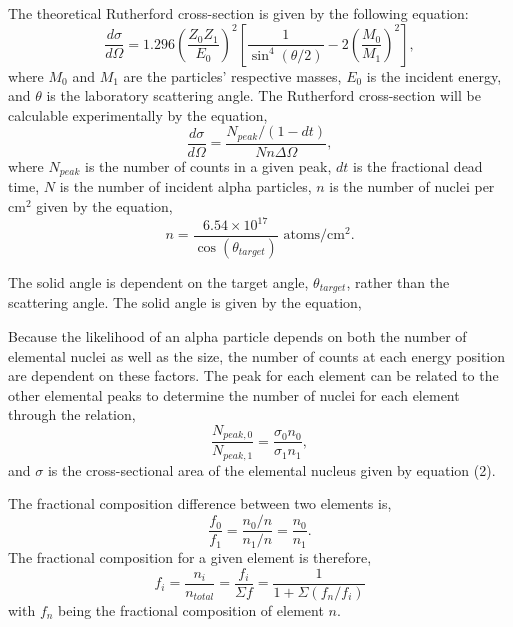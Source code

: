 \documentclass[10pt]{IEEEtran}
\begin{document}
The theoretical Rutherford cross-section is given by the following equation:
\begin{equation}
\frac{d\sigma}{d\Omega} = 1.296\left(\frac{Z_0 Z_1}{E_0}\right)^2\left[\frac{1}{\sin^4(\theta/2)}-2\left(\frac{M_0}{M_1}\right)^2\right],
\end{equation}
where $M_0$ and $M_1$ are the particles' respective masses, $E_0$ is the incident energy, and $\theta$ is the laboratory scattering angle. The Rutherford cross-section will be calculable experimentally by the equation\cite{blackboard},
\begin{equation}
\frac{d\sigma}{d\Omega} = \frac{N_{peak}/(1-dt)}{Nn\Delta\Omega},
\end{equation}
where $N_{peak}$ is the number of counts in a given peak, $dt$ is the fractional dead time, $N$ is the number of incident alpha particles, $n$ is the number of nuclei per cm$^2$ given by the equation,
\begin{equation}
n = \frac{6.54\times10^{17}}{\cos(\theta_{target})}\text{ atoms/cm$^2$}.
\end{equation}

The solid angle is dependent on the target angle, $\theta_{target}$, rather than the scattering angle. The solid angle is given by the equation,

Because the likelihood of an alpha particle depends on both the number of elemental nuclei as well as the size, the number of counts at each energy position are dependent on these factors. The peak for each element can be related to the other elemental peaks to determine the number of nuclei for each element through the relation,
\begin{equation}
\frac{N_{peak,0}}{N_{peak,1}} = \frac{\sigma_{0}n_{0}}{\sigma_{1}n_{1}},
\end{equation}
and $\sigma$ is the cross-sectional area of the elemental nucleus given by equation (2).

The fractional composition difference between two elements is,
\begin{equation}
\frac{f_0}{f_1} =  \frac{n_0/n}{n_1/n} = \frac{n_0}{n_1}.
\end{equation}
The fractional composition for a given element is therefore,
\begin{equation}
f_i = \frac{n_i}{n_{total}} = \frac{f_i}{\Sigma f} = \frac{1}{1+\Sigma (f_n/f_i)}
\end{equation}
with $f_n$ being the fractional composition of element $n$.
\end{document}
